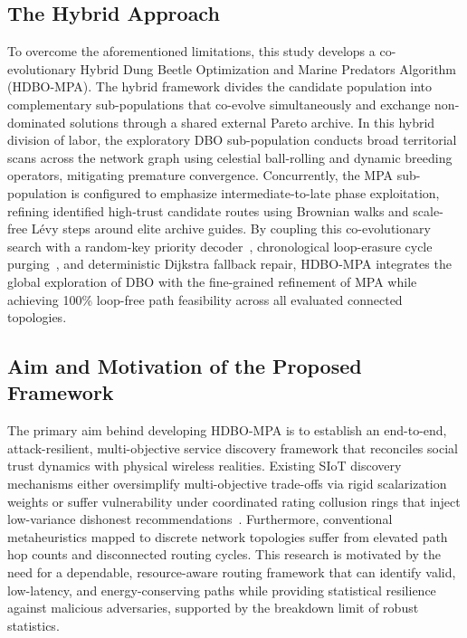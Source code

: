 \documentclass[journal,compsoc]{IEEEtran}
\begin{document}
\subsection{The Hybrid Approach}
To overcome the aforementioned limitations, this study develops a co-evolutionary Hybrid Dung Beetle Optimization and Marine Predators Algorithm (HDBO-MPA). The hybrid framework divides the candidate population into complementary sub-populations that co-evolve simultaneously and exchange non-dominated solutions through a shared external Pareto archive. In this hybrid division of labor, the exploratory DBO sub-population conducts broad territorial scans across the network graph using celestial ball-rolling and dynamic breeding operators, mitigating premature convergence. Concurrently, the MPA sub-population is configured to emphasize intermediate-to-late phase exploitation, refining identified high-trust candidate routes using Brownian walks and scale-free L\'evy steps around elite archive guides. By coupling this co-evolutionary search with a random-key priority decoder~\cite{chaves2024biased}, chronological loop-erasure cycle purging~\cite{jarai2020toppling}, and deterministic Dijkstra fallback repair, HDBO-MPA integrates the global exploration of DBO with the fine-grained refinement of MPA while achieving 100\% loop-free path feasibility across all evaluated connected topologies.

\subsection{Aim and Motivation of the Proposed Framework}
The primary aim behind developing HDBO-MPA is to establish an end-to-end, attack-resilient, multi-objective service discovery framework that reconciles social trust dynamics with physical wireless realities. Existing SIoT discovery mechanisms either oversimplify multi-objective trade-offs via rigid scalarization weights or suffer vulnerability under coordinated rating collusion rings that inject low-variance dishonest recommendations~\cite{jung2025social, zhang2025trust}. Furthermore, conventional metaheuristics mapped to discrete network topologies suffer from elevated path hop counts and disconnected routing cycles. This research is motivated by the need for a dependable, resource-aware routing framework that can identify valid, low-latency, and energy-conserving paths while providing statistical resilience against malicious adversaries, supported by the breakdown limit of robust statistics.
\end{document}

